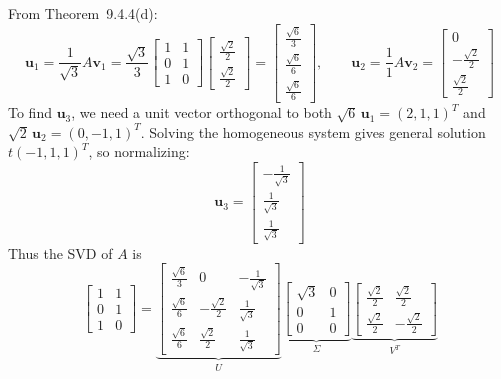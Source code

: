 \documentclass{article}
\begin{document}
From Theorem~9.4.4(d):
\[
  \mathbf{u}_1 = \frac{1}{\sqrt{3}}A\mathbf{v}_1
  = \frac{\sqrt{3}}{3}\begin{bmatrix}1&1\\0&1\\1&0\end{bmatrix}
    \begin{bmatrix}\tfrac{\sqrt{2}}{2}\\\tfrac{\sqrt{2}}{2}\end{bmatrix}
  = \begin{bmatrix}\tfrac{\sqrt{6}}{3}\\\tfrac{\sqrt{6}}{6}\\\tfrac{\sqrt{6}}{6}\end{bmatrix},
  \qquad
  \mathbf{u}_2 = \frac{1}{1}A\mathbf{v}_2 = \begin{bmatrix}0\\-\tfrac{\sqrt{2}}{2}\\\tfrac{\sqrt{2}}{2}\end{bmatrix}
\]
To find $\mathbf{u}_3$, we need a unit vector orthogonal to both $\sqrt{6}\,\mathbf{u}_1 = (2,1,1)^T$
and $\sqrt{2}\,\mathbf{u}_2 = (0,-1,1)^T$. Solving the homogeneous system gives
general solution $t(-1,1,1)^T$, so normalizing:
\[
  \mathbf{u}_3 = \begin{bmatrix}-\tfrac{1}{\sqrt{3}}\\\tfrac{1}{\sqrt{3}}\\\tfrac{1}{\sqrt{3}}\end{bmatrix}
\]
Thus the SVD of $A$ is
\[
  \begin{bmatrix}1&1\\0&1\\1&0\end{bmatrix}
  = \underbrace{\begin{bmatrix}
      \tfrac{\sqrt{6}}{3} & 0 & -\tfrac{1}{\sqrt{3}}\\
      \tfrac{\sqrt{6}}{6} & -\tfrac{\sqrt{2}}{2} & \tfrac{1}{\sqrt{3}}\\
      \tfrac{\sqrt{6}}{6} & \tfrac{\sqrt{2}}{2} & \tfrac{1}{\sqrt{3}}
    \end{bmatrix}}_{U}
  \underbrace{\begin{bmatrix}\sqrt{3}&0\\0&1\\0&0\end{bmatrix}}_{\Sigma}
  \underbrace{\begin{bmatrix}
      \tfrac{\sqrt{2}}{2} & \tfrac{\sqrt{2}}{2}\\
      \tfrac{\sqrt{2}}{2} & -\tfrac{\sqrt{2}}{2}
    \end{bmatrix}}_{V^T}
\]
\end{document}
